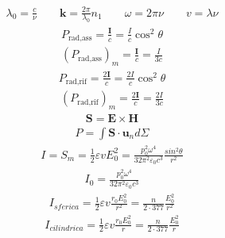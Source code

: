 \documentclass[10pt, twocolumn, a4paper, fleqn]{article}
\def\bb{\mathbf}
\def\e{\varepsilon}
\def\E{\bb{E}}
\def\H{\bb{H}}
\def\un{\bb{u}_n}
\def\S{\bb{S}}
\def\I{\bb{I}}
\def\n{n_}
\begin{document}
\begin{equation*}\begin{split}
\lambda_0=\frac{c}{\nu} \qquad \bb{k}=\frac{2\pi}{\lambda_0}\n1 \qquad \omega =2\pi\nu \qquad v=\lambda\nu
\end{split}\end{equation*}
\begin{equation*}\begin{split}
P_{\textrm{rad,ass}}=\frac{\I}{c}=\frac{I}{c}\cos^2{\theta}
\end{split}\end{equation*}
\begin{equation*}\begin{split}
(P_{\textrm{rad,ass}})_m=\frac{\I}{c}=\frac{I}{3c}
\end{split}\end{equation*}
\begin{equation*}\begin{split}
P_{\textrm{rad,rif}}=\frac{2\I}{c}=\frac{2I}{c}\cos^2{\theta}
\end{split}\end{equation*}
\begin{equation*}\begin{split}
(P_{\textrm{rad,rif}})_m=\frac{2\I}{c}=\frac{2I}{3c}
\end{split}\end{equation*}
\begin{equation*}\begin{split}
\S=\E\times\H
\end{split}\end{equation*}
\begin{equation*}\begin{split}
P=\int{\S\cdot \un d\Sigma}
\end{split}\end{equation*}
\begin{equation*}\begin{split}
I=S_m=\frac{1}{2}\e vE_0^2=\frac{p_0^2\omega ^4}{32\pi^2\e_0c^3}\frac{sin^2{\theta}}{r^2}
\end{split}\end{equation*}
\begin{equation*}\begin{split}
I_0=\frac{p_0^2\omega ^4}{32\pi^2\e_0c^3}
\end{split}\end{equation*}
\begin{equation*}\begin{split}
I_{sferica}=\frac{1}{2}\e v\frac{r_0E_0^2}{r^2}=\frac{n}{2\cdot 377}\frac{E_0^2}{r^2}
\end{split}\end{equation*}
\begin{equation*}\begin{split}
I_{cilindrica}=\frac{1}{2}\e v\frac{r_0E_0^2}{r}=\frac{n}{2\cdot 377}\frac{E_0^2}{r}
\end{split}\end{equation*}
\end{document}

